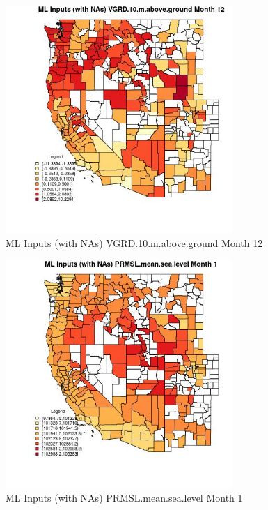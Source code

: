 \begin{figure} 
\centering  
\includegraphics[width=0.77\textwidth]{Code_Outputs/Report_ML_input_PM25_Step4_part_f_de_duplicated_aves_prioritize_24hr_obswNAs_CountyVGRD10mabovegroundmedianMonth12.jpg} 
\caption{\label{fig:Report_ML_input_PM25_Step4_part_f_de_duplicated_aves_prioritize_24hr_obswNAsCountyVGRD10mabovegroundmedianMonth12}ML Inputs (with NAs) VGRD.10.m.above.ground Month 12} 
\end{figure} 
 

\begin{figure} 
\centering  
\includegraphics[width=0.77\textwidth]{Code_Outputs/Report_ML_input_PM25_Step4_part_f_de_duplicated_aves_prioritize_24hr_obswNAs_CountyPRMSLmeansealevelmedianMonth1.jpg} 
\caption{\label{fig:Report_ML_input_PM25_Step4_part_f_de_duplicated_aves_prioritize_24hr_obswNAsCountyPRMSLmeansealevelmedianMonth1}ML Inputs (with NAs) PRMSL.mean.sea.level Month 1} 
\end{figure} 
 

